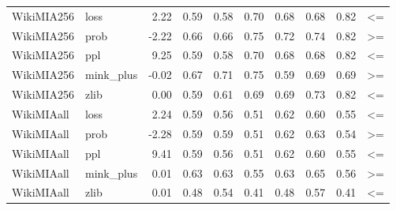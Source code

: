 \begin{tabular}{llrrrrrrrl}
WikiMIA256 &      loss &           2.22 &           0.59 &         0.58 &            0.70 &          0.68 &        0.68 &           0.82 &                  <= \\
WikiMIA256 &      prob &          -2.22 &           0.66 &         0.66 &            0.75 &          0.72 &        0.74 &           0.82 &                  >= \\
WikiMIA256 &       ppl &           9.25 &           0.59 &         0.58 &            0.70 &          0.68 &        0.68 &           0.82 &                  <= \\
WikiMIA256 & mink\_plus &          -0.02 &           0.67 &         0.71 &            0.75 &          0.59 &        0.69 &           0.69 &                  >= \\
WikiMIA256 &      zlib &           0.00 &           0.59 &         0.61 &            0.69 &          0.69 &        0.73 &           0.82 &                  <= \\
WikiMIAall &      loss &           2.24 &           0.59 &         0.56 &            0.51 &          0.62 &        0.60 &           0.55 &                  <= \\
WikiMIAall &      prob &          -2.28 &           0.59 &         0.59 &            0.51 &          0.62 &        0.63 &           0.54 &                  >= \\
WikiMIAall &       ppl &           9.41 &           0.59 &         0.56 &            0.51 &          0.62 &        0.60 &           0.55 &                  <= \\
WikiMIAall & mink\_plus &           0.01 &           0.63 &         0.63 &            0.55 &          0.63 &        0.65 &           0.56 &                  >= \\
WikiMIAall &      zlib &           0.01 &           0.48 &         0.54 &            0.41 &          0.48 &        0.57 &           0.41 &                  <= \\
\bottomrule
\end{tabular}
